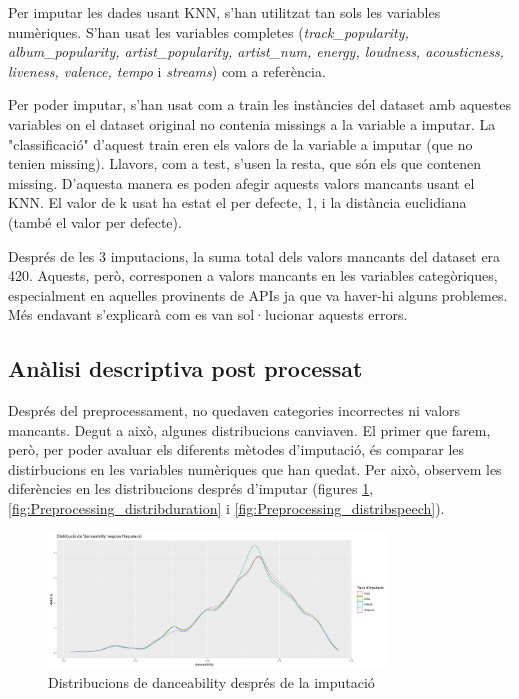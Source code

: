Per imputar les dades usant KNN, s'han utilitzat tan sols les variables numèriques. S'han usat les variables completes (\textit{track\_popularity, album\_popularity, artist\_popularity, artist\_num, energy, loudness, acousticness, liveness, valence, tempo} i \textit{streams}) com a referència.

Per poder imputar, s'han usat com a train les instàncies del dataset amb aquestes variables on el dataset original no contenia missings a la variable a imputar. La "classificació" d'aquest train eren els valors de la variable a imputar (que no tenien missing). Llavors, com a test, s'usen la resta, que són els que contenen missing. D'aquesta manera es poden afegir aquests valors mancants usant el KNN. El valor de k usat ha estat el per defecte, 1, i la distància euclidiana (també el valor per defecte).

Després de les 3 imputacions, la suma total dels valors mancants del dataset era 420. Aquests, però, corresponen a valors mancants en les variables categòriques, especialment en aquelles provinents de APIs ja que va haver-hi alguns problemes. Més endavant s'explicarà com es van sol·lucionar aquests errors.


\subsection{Anàlisi descriptiva post processat}

Després del preprocessament, no quedaven categories incorrectes ni valors mancants. Degut a això, algunes distribucions canviaven. El primer que farem, però, per poder avaluar els diferents mètodes d'imputació, és comparar les distirbucions en les variables numèriques que han quedat. Per això, observem les diferències en les distribucions després d'imputar (figures \ref{fig:Preprocessing_distribdance}, \ref{fig:Preprocessing_distribduration} i \ref{fig:Preprocessing_distribspeech}).

\begin{figure}[H]
    \centering
    \includegraphics[width=0.8\textwidth]{Images/3_Preprocessing/distrib_imputation_danceability.png}
    \caption{Distribucions de danceability després de la imputació}
    \label{fig:Preprocessing_distribdance}
\end{figure}

